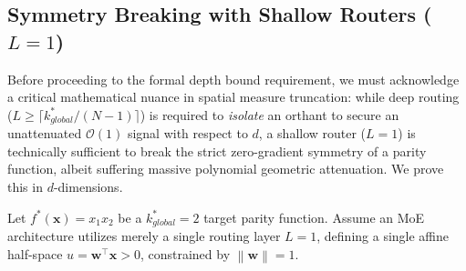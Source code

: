 \documentclass{article}
\newcommand{\1}{\mathbb{I}}
\newcommand{\norm}[1]{\left\lVert#1\right\rVert}
\newcommand{\calO}{\mathcal{O}}
\newcommand{\bx}{\mathbf{x}}
\newcommand{\bw}{\mathbf{w}}
\begin{document}
\subsection{Symmetry Breaking with Shallow Routers ($L=1$)}
\label{app:thm_shallow_break}

Before proceeding to the formal depth bound requirement, we must acknowledge a critical mathematical nuance in spatial measure truncation: while deep routing ($L \ge \lceil k_{global}^* / (N-1) \rceil$) is required to \textit{isolate} an orthant to secure an unattenuated $\calO(1)$ signal with respect to $d$, a shallow router ($L=1$) is technically sufficient to break the strict zero-gradient symmetry of a parity function, albeit suffering massive polynomial geometric attenuation. We prove this in $d$-dimensions.

Let $f^*(\bx) = x_1 x_2$ be a $k_{global}^* = 2$ target parity function. Assume an MoE architecture utilizes merely a single routing layer $L=1$, defining a single affine half-space $u = \bw^\top \bx > 0$, constrained by $\norm{\bw} = 1$.
\end{document}
